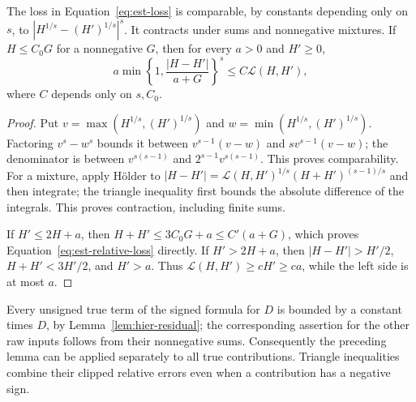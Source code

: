\begin{lemma}\label{lem:est-loss}
The loss in Equation~\eqref{eq:est-loss} is comparable, by constants
depending only on $s$, to $|H^{1/s}-(H')^{1/s}|^s$.  It contracts under
sums and nonnegative mixtures.  If $H\le C_0G$ for a nonnegative $G$, then
for every $a>0$ and $H'\ge0$,
\begin{equation}
 a\min\left\{1,\frac{|H-H'|}{a+G}\right\}^{s}
       \le C\mathcal L(H,H'),
 \label{eq:est-relative-loss}
\end{equation}
where $C$ depends only on $s,C_0$.
\end{lemma}
\begin{proof}
Put $v=\max(H^{1/s},(H')^{1/s})$ and
$w=\min(H^{1/s},(H')^{1/s})$.  Factoring $v^s-w^s$ bounds it between
$v^{s-1}(v-w)$ and $sv^{s-1}(v-w)$; the denominator is between
$v^{s(s-1)}$ and $2^{s-1}v^{s(s-1)}$.  This proves comparability.
For a mixture, apply H\"older to
$|H-H'|=\mathcal L(H,H')^{1/s}(H+H')^{(s-1)/s}$ and then integrate;
the triangle inequality first bounds the absolute difference of the
integrals.  This proves contraction, including finite sums.

If $H'\le2H+a$, then $H+H'\le3C_0G+a\le C'(a+G)$, which proves
Equation~\eqref{eq:est-relative-loss} directly.  If $H'>2H+a$, then
$|H-H'|>H'/2$, $H+H'<3H'/2$, and $H'>a$.
Thus $\mathcal L(H,H')\ge cH'\ge ca$, while the left side is at most $a$.
\end{proof}

Every unsigned true term of the signed formula for $D$ is bounded by a
constant times $D$, by Lemma~\ref{lem:hier-residual}; the corresponding
assertion for the other raw inputs follows from their nonnegative sums.
Consequently the preceding lemma can be applied separately to all true
contributions.  Triangle inequalities combine their clipped relative
errors even when a contribution has a negative sign.

